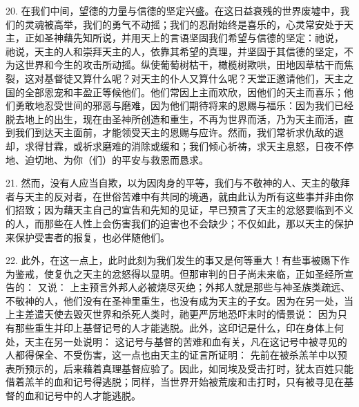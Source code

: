 20. 在我们中间，望德的力量与信德的坚定兴盛。在这日益衰残的世界废墟中，我们的灵魂被高举，我们的勇气不动摇；我们的忍耐始终是喜乐的，心灵常安处于天主，正如圣神藉先知所说，并用天上的言语坚固我们希望与信德的坚定：祂说，  祂说，天主的人和崇拜天主的人，依靠其希望的真理，并坚固于其信德的坚定，不为这世界和今生的攻击所动摇。纵使葡萄树枯干，橄榄树欺哄，田地因草枯干而焦裂，这对基督徒又算什么呢？对天主的仆人又算什么呢？天堂正邀请他们，天主之国的全部恩宠和丰盈正等候他们。他们常因上主而欢欣，因他们的天主而喜乐；他们勇敢地忍受世间的邪恶与磨难，因为他们期待将来的恩赐与福乐：因为我们已经脱去地上的出生，现在由圣神所创造和重生，不再为世界而活，乃为天主而活，直到我们到达天主面前，才能领受天主的恩赐与应许。然而，我们常祈求仇敌的退却，求得甘霖，或祈求磨难的消除或缓和；我们倾心祈祷，求天主息怒，日夜不停地、迫切地、为你（们）的平安与救恩而恳求。\par

21. 然而，没有人应当自欺，以为因肉身的平等，我们与不敬神的人、天主的敬拜者与天主的反对者，在世俗苦难中有共同的境遇，就由此认为所有这些事并非由你们招致；因为藉天主自己的宣告和先知的见证，早已预言了天主的忿怒要临到不义的人，而那些在人性上会伤害我们的迫害也不会缺少；不仅如此，那以天主的保护来保护受害者的报复，也必伴随他们。\par

22. 此外，在这一点上，此时此刻为我们发生的事又是何等重大！有些事被赐下作为鉴戒，使复仇之天主的忿怒得以显明。但那审判的日子尚未来临，正如圣经所宣告的：  又说：  上主预言外邦人必被烧尽灭绝；外邦人就是那些与神圣族类疏远、不敬神的人，他们没有在圣神里重生，也没有成为天主的子女。因为在另一处，当上主差遣天使去毁灭世界和杀死人类时，祂更严厉地恐吓末时的情景说：  因为只有那些重生并印上基督记号的人才能逃脱。此外，这印记是什么，印在身体上何处，天主在另一处说明：  这记号与基督的苦难和血有关，凡在这记号中被寻见的人都得保全、不受伤害，这一点也由天主的证言所证明：  先前在被杀羔羊中以预表所预示的，后来藉着真理基督应验了。因此，如同埃及受击打时，犹太百姓只能借着羔羊的血和记号得逃脱；同样，当世界开始被荒废和击打时，只有被寻见在基督的血和记号中的人才能逃脱。\par

